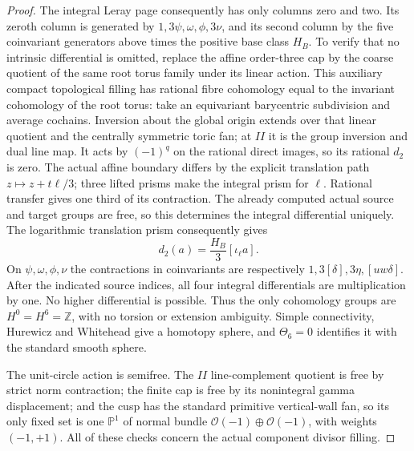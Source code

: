 \begin{proof}
The integral Leray page consequently has only columns zero and two. Its zeroth column is generated by \(1,3\psi,\omega,\phi,3\nu\), and its second column by the five coinvariant generators above times the positive base class \(H_B\). To verify that no intrinsic differential is omitted, replace the affine order-three cap by the coarse quotient of the same root torus family under its linear action. This auxiliary compact topological filling has rational fibre cohomology equal to the invariant cohomology of the root torus: take an equivariant barycentric subdivision and average cochains. Inversion about the global origin extends over that linear quotient and the centrally symmetric toric fan; at \(II\) it is the group inversion and dual line map. It acts by \((-1)^q\) on the rational direct images, so its rational \(d_2\) is zero. The actual affine boundary differs by the explicit translation path \(z\mapsto z+t\ell/3\); three lifted prisms make the integral prism for \(\ell\). Rational transfer gives one third of its contraction. The already computed actual source and target groups are free, so this determines the integral differential uniquely. The logarithmic translation prism consequently gives \[
 d_2(a)=\frac{H_B}{3}[\iota_\ell a].
\] On \(\psi,\omega,\phi,\nu\) the contractions in coinvariants are respectively \(1,3[\delta],3\eta,[uw\delta]\). After the indicated source indices, all four integral differentials are multiplication by one. No higher differential is possible. Thus the only cohomology groups are \(H^0=H^6=\mathbb Z\), with no torsion or extension ambiguity. Simple connectivity, Hurewicz and Whitehead give a homotopy sphere, and \(\Theta_6=0\) identifies it with the standard smooth sphere.

The unit-circle action is semifree. The \(II\) line-complement quotient is free by strict norm contraction; the finite cap is free by its nonintegral gamma displacement; and the cusp has the standard primitive vertical-wall fan, so its only fixed set is one \(\mathbb P^1\) of normal bundle \(\mathcal O(-1)\oplus\mathcal O(-1)\), with weights \((-1,+1)\). All of these checks concern the actual component divisor filling.
\end{proof}
